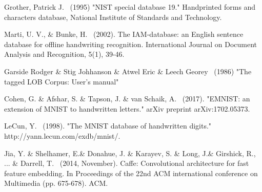 \documentclass{article}
\begin{document}
\begin{thebibliography}{99}
   Grother, Patrick J. \ (1995) "NIST special database 19." Handprinted forms and characters database, National Institute of Standards and Technology.

   Marti, U. V., \& Bunke, H. \ (2002). The IAM-database: an English sentence database for offline handwriting recognition. International Journal on Document Analysis and Recognition, 5(1), 39-46.

   Garside Rodger \& Stig Johhanson \& Atwel Eric \& Leech Georey \ (1986) "The tagged LOB Corpus: User's manual"

   Cohen, G. \& Afshar, S. \& Tapson, J. \& van Schaik, A. \ (2017). "EMNIST: an extension of MNIST to handwritten letters." arXiv preprint arXiv:1702.05373.

   LeCun, Y. \ (1998). "The MNIST database of handwritten digits." http://yann.lecun.com/exdb/mnist/.

   Jia, Y. \& Shelhamer, E.\& Donahue, J. \& Karayev, S. \& Long, J.\& Girshick, R., ... \& Darrell, T. \ (2014, November). Caffe: Convolutional architecture for fast feature embedding. In Proceedings of the 22nd ACM international conference on Multimedia (pp. 675-678). ACM.
\end{thebibliography}
\end{document}
